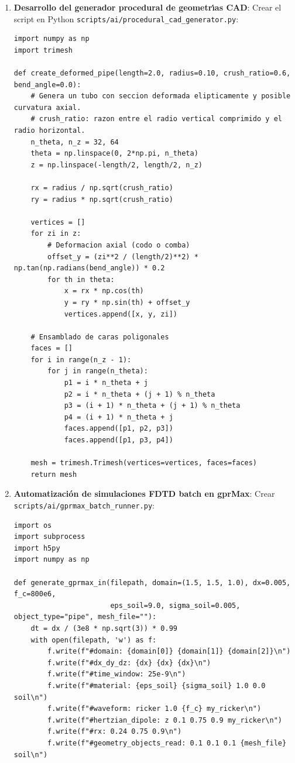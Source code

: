 \documentclass[11pt,a4paper]{article}
\begin{document}
\begin{enumerate}
    \item \textbf{Desarrollo del generador procedural de geometr{\'\i}as CAD}:
    Crear el script en Python \texttt{scripts/ai/procedural\_cad\_generator.py}:
\begin{verbatim}
import numpy as np
import trimesh

def create_deformed_pipe(length=2.0, radius=0.10, crush_ratio=0.6, bend_angle=0.0):
    # Genera un tubo con seccion deformada elipticamente y posible curvatura axial.
    # crush_ratio: razon entre el radio vertical comprimido y el radio horizontal.
    n_theta, n_z = 32, 64
    theta = np.linspace(0, 2*np.pi, n_theta)
    z = np.linspace(-length/2, length/2, n_z)
    
    rx = radius / np.sqrt(crush_ratio)
    ry = radius * np.sqrt(crush_ratio)
    
    vertices = []
    for zi in z:
        # Deformacion axial (codo o comba)
        offset_y = (zi**2 / (length/2)**2) * np.tan(np.radians(bend_angle)) * 0.2
        for th in theta:
            x = rx * np.cos(th)
            y = ry * np.sin(th) + offset_y
            vertices.append([x, y, zi])
            
    # Ensamblado de caras poligonales
    faces = []
    for i in range(n_z - 1):
        for j in range(n_theta):
            p1 = i * n_theta + j
            p2 = i * n_theta + (j + 1) % n_theta
            p3 = (i + 1) * n_theta + (j + 1) % n_theta
            p4 = (i + 1) * n_theta + j
            faces.append([p1, p2, p3])
            faces.append([p1, p3, p4])
            
    mesh = trimesh.Trimesh(vertices=vertices, faces=faces)
    return mesh
\end{verbatim}

    \item \textbf{Automatizaci{\'o}n de simulaciones FDTD batch en gprMax}:
    Crear \texttt{scripts/ai/gprmax\_batch\_runner.py}:
\begin{verbatim}
import os
import subprocess
import h5py
import numpy as np

def generate_gprmax_in(filepath, domain=(1.5, 1.5, 1.0), dx=0.005, f_c=800e6,
                       eps_soil=9.0, sigma_soil=0.005, object_type="pipe", mesh_file=""):
    dt = dx / (3e8 * np.sqrt(3)) * 0.99
    with open(filepath, 'w') as f:
        f.write(f"#domain: {domain[0]} {domain[1]} {domain[2]}\n")
        f.write(f"#dx_dy_dz: {dx} {dx} {dx}\n")
        f.write(f"#time_window: 25e-9\n")
        f.write(f"#material: {eps_soil} {sigma_soil} 1.0 0.0 soil\n")
        f.write(f"#waveform: ricker 1.0 {f_c} my_ricker\n")
        f.write(f"#hertzian_dipole: z 0.1 0.75 0.9 my_ricker\n")
        f.write(f"#rx: 0.24 0.75 0.9\n")
        f.write(f"#geometry_objects_read: 0.1 0.1 0.1 {mesh_file} soil\n")
\end{verbatim}


\end{enumerate}
\end{document}
